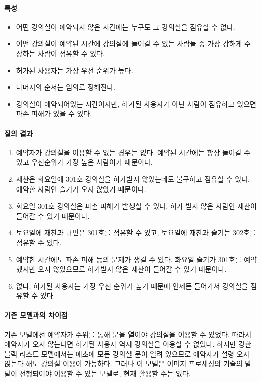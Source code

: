\documentclass[11pt,a4paper]{article}
\begin{document}
\paragraph{특성}
\begin{itemize}
\item 어떤 강의실이 예약되지 않은 시간에는 누구도 그 강의실을 점유할 수 없다.
\item 어떤 강의실이 예약된 시간에 강의실에 들어갈 수 있는 사람들 중 가장 강하게 주장하는 사람이 점유할 수 있다.
\item 허가된 사용자는 가장 우선 순위가 높다.
\item 나머지의 순서는 임의로 정해진다.
\item 강의실이 예약되어있는 시간이지만, 허가된 사용자가 아닌 사람이 점유하고 있으면 파손 피해가 있을 수 있다.
\end{itemize}

\paragraph{질의 결과}
\begin{enumerate}
\item 예약자가 강의실을 이용할 수 없는 경우는 없다. 예약된 시간에는 항상 들어갈 수 있고 우선순위가 가장 높은 사람이기 때문이다.
\item 재찬은 화요일에 301호 강의실을 허가받지 않았는데도 불구하고 점유할 수 있다. 예약한 사람인 슬기가 오지 않았기 때문이다.
\item 화요일 301호 강의실은 파손 피해가 발생할 수 있다. 허가 받지 않은 사람인 재찬이 들어갈 수 있기 때문이다.
\item 토요일에 재찬과 규민은 301호를 점유할 수 있고, 토요일에 재찬과 슬기는 302호를 점유할 수 있다.
\item 예약한 시간에도 파손 피해 등의 문제가 생길 수 있다. 화요일 슬기가 301호를 예약했지만 오지 않았으므로 허가받지 않은 재찬이 들어갈 수 있기 때문이다.
\item 없다. 허가된 사용자는 가장 우선 순위가 높기 때문에 언제든 들어가서 강의실을 점유할 수 있다.
\end{enumerate}

\paragraph{기존 모델과의 차이점}
\hfill\break
기존 모델에선 예약자가 수위를 통해 문을 열어야 강의실을 이용할 수 있었다.
따라서 예약자가 오지 않는다면 허가된 사용자 역시 강의실을 이용할 수 없었다.
하지만 강한 블랙 리스트 모델에서는 애초에 모든 강의실 문이 열려 있으므로
예약자가 설령 오지 않는다 해도 강의실 이용이 가능하다.
그러나 이 모델은 이미지 프로세싱의 기술의 발달이 선행되어야 이용할 수 있는 모델로, 현재 활용할 수는 없다.
\end{document}
